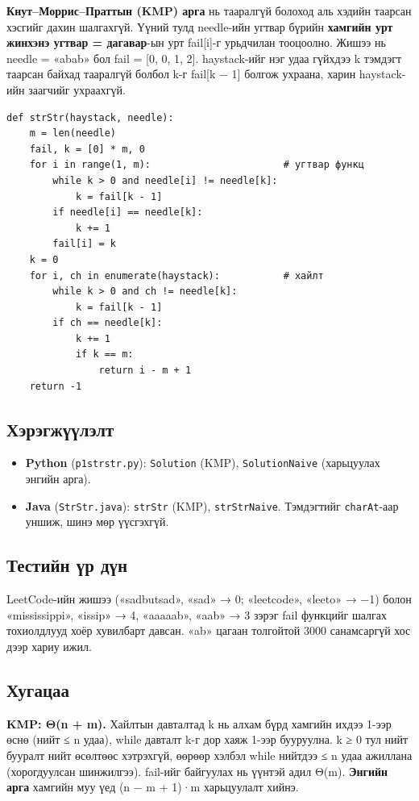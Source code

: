 \documentclass[11pt,a4paper]{article}
\renewcommand{\_}{\oldunderscore\allowbreak}
\begin{document}
\textbf{Кнут–Моррис–Праттын (KMP) арга} нь тааралгүй болоход аль хэдийн таарсан хэсгийг дахин шалгахгүй. Үүний тулд needle-ийн угтвар бүрийн \textbf{хамгийн урт жинхэнэ угтвар = дагавар}-ын урт fail[i]-г урьдчилан тооцоолно. Жишээ нь needle = «abab» бол fail = [0, 0, 1, 2]. haystack-ийг нэг удаа гүйхдээ k тэмдэгт таарсан байхад тааралгүй болбол k-г fail[k − 1] болгож ухраана, харин haystack-ийн заагчийг ухраахгүй.

\begin{Verbatim}
def strStr(haystack, needle):
    m = len(needle)
    fail, k = [0] * m, 0
    for i in range(1, m):                       # угтвар функц
        while k > 0 and needle[i] != needle[k]:
            k = fail[k - 1]
        if needle[i] == needle[k]:
            k += 1
        fail[i] = k
    k = 0
    for i, ch in enumerate(haystack):           # хайлт
        while k > 0 and ch != needle[k]:
            k = fail[k - 1]
        if ch == needle[k]:
            k += 1
            if k == m:
                return i - m + 1
    return -1
\end{Verbatim}

\subsection{Хэрэгжүүлэлт}
\begin{itemize}
\item \textbf{Python} (\texttt{p1\_str\_str.py}): \texttt{Solution} (KMP), \texttt{SolutionNaive} (харьцуулах энгийн арга).
\item \textbf{Java} (\texttt{StrStr.java}): \texttt{strStr} (KMP), \texttt{strStrNaive}. Тэмдэгтийг \texttt{charAt}-аар уншиж, шинэ мөр үүсгэхгүй.
\end{itemize}

\subsection{Тестийн үр дүн}
LeetCode-ийн жишээ («sadbutsad», «sad» → 0; «leetcode», «leeto» → −1) болон «mississippi», «issip» → 4, «aaaaab», «aab» → 3 зэрэг fail функцийг шалгах тохиолдлууд хоёр хувилбарт давсан. «ab» цагаан толгойтой 3000 санамсаргүй хос дээр хариу ижил.

\subsection{Хугацаа}
\textbf{KMP: Θ(n + m).} Хайлтын давталтад k нь алхам бүрд хамгийн ихдээ 1-ээр өснө (нийт ≤ n удаа), while давталт k-г дор хаяж 1-ээр бууруулна. k ≥ 0 тул нийт бууралт нийт өсөлтөөс хэтрэхгүй, өөрөөр хэлбэл while нийтдээ ≤ n удаа ажиллана (хорогдуулсан шинжилгээ). fail-ийг байгуулах нь үүнтэй адил Θ(m). \textbf{Энгийн арга} хамгийн муу үед (n − m + 1)·m харьцуулалт хийнэ.
\end{document}
